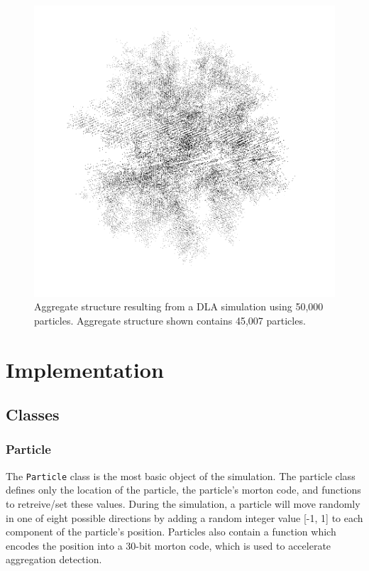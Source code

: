 \documentclass[fleqn,10pt]{SelfArx} %
\begin{document}
\begin{figure}[ht]\centering %
    \includegraphics[width=\linewidth]{DLA45007-2-BW.png}
    \caption{Aggregate structure resulting from a DLA simulation using 50,000 particles. Aggregate structure shown contains 45,007 particles.}
    \label{fig:DLA45007}
    \end{figure}


\section{Implementation}
\subsection{Classes}
\subsubsection{Particle}
The \texttt{Particle} class is the most basic object of the simulation. The particle class defines only the location of the particle, the particle’s morton code, and functions to retreive/set these values. During the simulation, a particle will move randomly in one of eight possible directions by adding a random integer value [-1, 1] to each component of the particle’s position. Particles also contain a function which encodes the position into a 30-bit morton code, which is used to accelerate aggregation detection.
\end{document}
